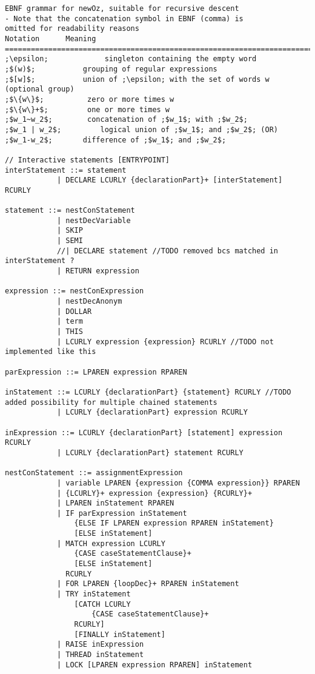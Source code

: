 \begin{lstlisting}[label={lst:newOzEBNF},language=ebnf]
EBNF grammar for newOz, suitable for recursive descent
- Note that the concatenation symbol in EBNF (comma) is
omitted for readability reasons
Notation      Meaning
===========================================================================
;\epsilon;             singleton containing the empty word
;$(w)$;           grouping of regular expressions
;$[w]$;           union of ;\epsilon; with the set of words w (optional group)
;$\{w\}$;          zero or more times w
;$\{w\}+$;         one or more times w
;$w_1~w_2$;        concatenation of ;$w_1$; with ;$w_2$;
;$w_1 | w_2$;         logical union of ;$w_1$; and ;$w_2$; (OR)
;$w_1-w_2$;       difference of ;$w_1$; and ;$w_2$;

// Interactive statements [ENTRYPOINT]
interStatement ::= statement
            | DECLARE LCURLY {declarationPart}+ [interStatement] RCURLY

statement ::= nestConStatement
            | nestDecVariable
            | SKIP
            | SEMI
            //| DECLARE statement //TODO removed bcs matched in interStatement ?
            | RETURN expression

expression ::= nestConExpression
            | nestDecAnonym
            | DOLLAR
            | term
            | THIS
            | LCURLY expression {expression} RCURLY //TODO not implemented like this

parExpression ::= LPAREN expression RPAREN

inStatement ::= LCURLY {declarationPart} {statement} RCURLY //TODO added possibility for multiple chained statements
            | LCURLY {declarationPart} expression RCURLY

inExpression ::= LCURLY {declarationPart} [statement] expression RCURLY
            | LCURLY {declarationPart} statement RCURLY

nestConStatement ::= assignmentExpression
            | variable LPAREN {expression {COMMA expression}} RPAREN
            | {LCURLY}+ expression {expression} {RCURLY}+
            | LPAREN inStatement RPAREN
            | IF parExpression inStatement
                {ELSE IF LPAREN expression RPAREN inStatement}
                [ELSE inStatement]
            | MATCH expression LCURLY
                {CASE caseStatementClause}+
                [ELSE inStatement]
              RCURLY
            | FOR LPAREN {loopDec}+ RPAREN inStatement
            | TRY inStatement
                [CATCH LCURLY
                    {CASE caseStatementClause}+
                RCURLY]
                [FINALLY inStatement]
            | RAISE inExpression
            | THREAD inStatement
            | LOCK [LPAREN expression RPAREN] inStatement


\end{lstlisting}
